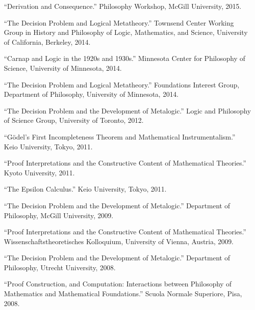 \documentclass[11pt]{article}
\def\printdate#1{\xprintdate#1-}
\def\xprintdate#1-#2-#3-{#1}
\begin{document}
\ind ``Derivation and Consequence.'' Philosophy Workshop, McGill University, \printdate{2015-04-10}.


\ind ``The Decision Problem and Logical Metatheory.'' Townsend Center Working Group in History and Philosophy of Logic,
Mathematics, and Science, University of California, Berkeley, \printdate{2014-11-05}.


\ind ``Carnap and Logic in the 1920s and 1930s.'' Minnesota Center for Philosophy of Science, University of Minnesota, \printdate{2014-04-25}.


\ind ``The Decision Problem and Logical Metatheory.'' Foundations Interest Group, Department of Philosophy, University of Minnesota, \printdate{2014-04-24}.










\ind ``The Decision Problem and the Development of Metalogic.'' Logic and Philosophy of Science Group, University of Toronto, \printdate{2012-03-29}.



\ind ``Gödel's First Incompleteness Theorem and Mathematical Instrumentalism.'' Keio University, Tokyo, \printdate{2011-00-00}.


\ind ``Proof Interpretations and the Constructive Content of Mathematical
Theories.'' Kyoto University, \printdate{2011-00-00}.


\ind ``The Epsilon Calculus.'' Keio University, Tokyo, \printdate{2011-00-00}.




\ind ``The Decision Problem and the Development of Metalogic.'' Department of Philosophy, McGill University, \printdate{2009-12-04}.


\ind ``Proof Interpretations and the Constructive Content of Mathematical
Theories.'' Wissenschaftstheoretisches Kolloquium, University of Vienna, Austria, \printdate{2009-05-07}.




\ind ``The Decision Problem and the Development of Metalogic.'' Department of Philosophy, Utrecht University, \printdate{2008-06-25}.



\ind ``Proof Construction, and Computation: Interactions between Philosophy of
Mathematics and Mathematical Foundations.'' Scuola Normale Superiore, Pisa, \printdate{2008-03-04}.
\end{document}
